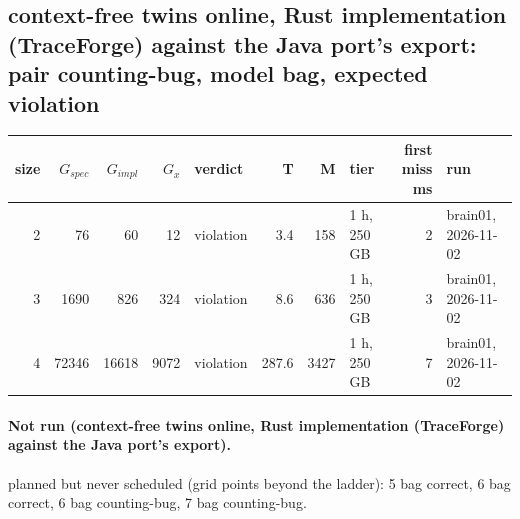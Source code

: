 \documentclass[10pt]{article}
\begin{document}
\subsection*{context-free twins online, Rust implementation (TraceForge) against the Java port's export: pair \textsf{counting-bug}, model bag, expected violation}
\begin{longtable}{@{}rrrrlrrlrl@{}}
\toprule
size & $G_{\mathit{spec}}$ & $G_{\mathit{impl}}$ & $G_x$ & verdict & T & M & tier & first miss ms & run \\
\midrule
\endhead
\color{red} 2 & 76 & 60 & 12 & violation & 3.4 & 158 & 1 h, 250 GB & 2 & brain01, 2026-11-02 \\
\color{red} 3 & 1690 & 826 & 324 & violation & 8.6 & 636 & 1 h, 250 GB & 3 & brain01, 2026-11-02 \\
\color{red} 4 & 72346 & 16618 & 9072 & violation & 287.6 & 3427 & 1 h, 250 GB & 7 & brain01, 2026-11-02 \\
\bottomrule
\end{longtable}
\paragraph{Not run (context-free twins online, Rust implementation (TraceForge) against the Java port's export).}
planned but never scheduled (grid points beyond the ladder): 5 bag correct, 6 bag correct, 6 bag counting-bug, 7 bag counting-bug.\par
\end{document}
